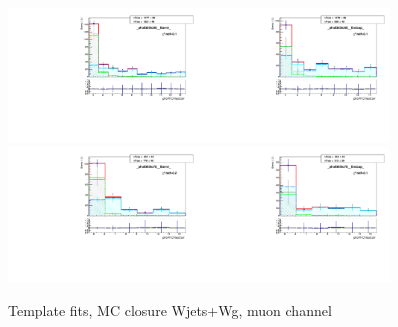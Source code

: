 \begin{figure}[htb]
\begin{center}
   \includegraphics[width=0.45\textwidth]{../figs/figs_v11/MUON_WGamma/MCclosureWjetsPlusWg/c_TEMPL_CHISO_UNblind__phoEt55to65__Barrel__RooFit_MCclosure.pdf}\includegraphics[width=0.45\textwidth]{../figs/figs_v11/MUON_WGamma/MCclosureWjetsPlusWg/c_TEMPL_CHISO_UNblind__phoEt55to65__Endcap__RooFit_MCclosure.pdf}\\
   \includegraphics[width=0.45\textwidth]{../figs/figs_v11/MUON_WGamma/MCclosureWjetsPlusWg/c_TEMPL_CHISO_UNblind__phoEt65to75__Barrel__RooFit_MCclosure.pdf}\includegraphics[width=0.45\textwidth]{../figs/figs_v11/MUON_WGamma/MCclosureWjetsPlusWg/c_TEMPL_CHISO_UNblind__phoEt65to75__Endcap__RooFit_MCclosure.pdf}\\
  \label{fig:templateFits_MCclosureWjetsPlusWg_CHISO_MUON_2}
  \caption{Template fits, MC closure Wjets+Wg, muon channel}
  \end{center}
\end{figure}

